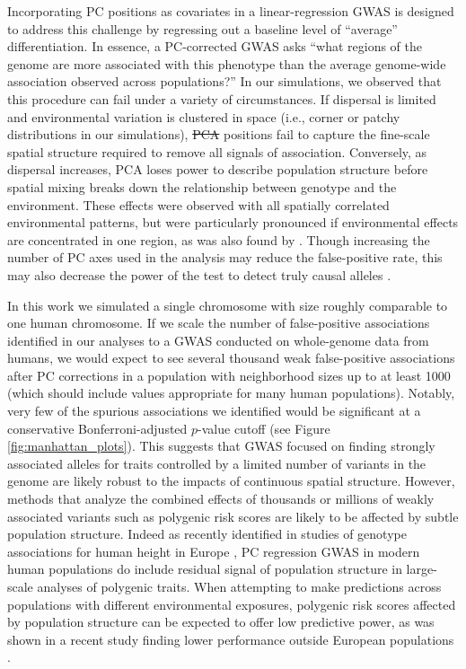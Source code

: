 \documentclass[10pt,twoside,lineno,hidelinks]{preprint} %
\providecommand{\DIFadd}[1]{{\protect\color{blue}\uwave{#1}}} %
\providecommand{\DIFdel}[1]{{\protect\color{red}\sout{#1}}}                      %
\providecommand{\DIFaddbegin}{} %
\providecommand{\DIFaddend}{} %
\providecommand{\DIFdelbegin}{} %
\providecommand{\DIFdelend}{} %
\begin{document}
Incorporating PC positions as covariates in a linear-regression GWAS \citep{Price2006} is designed to address this challenge by regressing out a baseline level of ``average'' differentiation. 
In essence, a PC-corrected GWAS asks ``what regions of the genome are more associated with this phenotype than the average genome-wide association observed across populations?'' 
In our simulations, we observed that this procedure can fail under a variety of circumstances. 
If dispersal is limited and environmental variation is clustered in space (i.e., corner or patchy distributions in our simulations), \DIFdelbegin \DIFdel{PCA }\DIFdelend \DIFaddbegin \DIFadd{PC }\DIFaddend positions fail to capture the fine-scale spatial structure required to remove all signals of association. Conversely, as dispersal increases, PCA loses power to describe population structure before spatial mixing breaks down the relationship between genotype and the environment. These effects were observed with all spatially correlated environmental patterns, but were particularly pronounced if environmental effects are concentrated in one region, as was also found by \citet{Mathieson2012}. Though increasing the number of PC axes used in the analysis may reduce the false-positive rate, this may also decrease the power of the test to detect truly causal alleles \citep{Lawson2019}. 

In this work we simulated a single chromosome with size roughly comparable to one human chromosome. If we scale the number of false-positive associations identified in our analyses to a GWAS conducted on whole-genome data from humans, we would expect to see several thousand weak false-positive associations after PC corrections in a population with neighborhood sizes up to at least 1000 (which should include values appropriate for many human populations). Notably, very few of the spurious associations we identified would be significant at a conservative Bonferroni-adjusted $p$-value cutoff (see Figure \ref{fig:manhattan_plots}). This suggests that GWAS focused on finding strongly associated alleles for traits controlled by a limited number of variants in the genome are likely robust to the impacts of continuous spatial structure. However, methods that analyze the combined effects of thousands or millions of weakly associated variants such as polygenic risk scores \citep{Khera2018} are likely to be affected by subtle population structure. Indeed as recently identified in studies of genotype associations for human height in Europe \citep{Berg2018,Sohail2018}, PC regression GWAS in modern human populations do include residual signal of population structure in large-scale analyses of polygenic traits. When attempting to make predictions across populations with different environmental exposures, polygenic risk scores affected by population structure can be expected to offer low predictive power, as was shown in a recent study finding lower performance outside European populations \citep{Martin2019}. 
\end{document}
